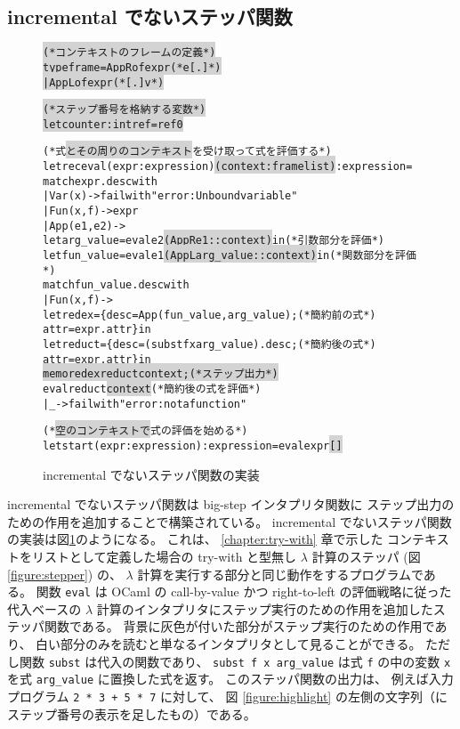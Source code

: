 \subsection{incremental でないステッパ関数}

\begin{figure}[t]
\begin{spacing}{0.8}
  \begin{alltt}
\colorbox{lightgray}{(* コンテキストのフレームの定義 *)}
\colorbox{lightgray}{type frame = AppR of expr  (* e [.] *)}
\colorbox{lightgray}{           | AppL of expr  (* [.] v *)}

\colorbox{lightgray}{(* ステップ番号を格納する変数 *)}
\colorbox{lightgray}{let counter : int ref = ref 0}

(* 式\colorbox{lightgray}{とその周りのコンテキスト}を受け取って式を評価する *)
let rec eval (expr : expression) \colorbox{lightgray}{(context : frame list)} : expression =
  match expr.desc with
    | Var (x) -> failwith "error: Unbound variable"
    | Fun (x, f) -> expr
    | App (e1, e2) ->
      let arg_value = eval e2 \colorbox{lightgray}{(AppR e1 :: context)} in      (* 引数部分を評価 *)
      let fun_value = eval e1 \colorbox{lightgray}{(AppL arg_value :: context)} in(*関数部分を評価 *)
      match fun_value.desc with
        | Fun (x, f) ->
          let redex = \{desc = App (fun_value, arg_value);       (* 簡約前の式 *)
                      attr = expr.attr\} in
          let reduct = \{desc = (subst f x arg_value).desc ;     (* 簡約後の式 *)
                        attr = expr.attr\} in
          \colorbox{lightgray}{memo redex reduct context;                          (* ステップ出力 *)}
          eval reduct \colorbox{lightgray}{context}                             (* 簡約後の式を評価 *)
        | _ -> failwith "error: not a function"

(* \colorbox{lightgray}{空のコンテキストで}式の評価を始める *)
let start (expr : expression) : expression = eval expr \colorbox{lightgray}{[]}
\end{alltt}
\end{spacing}
\caption{incremental でないステッパ関数の実装}
\label{figure:old-stepper}
\end{figure}

incremental でないステッパ関数は big-step インタプリタ関数に
ステップ出力のための作用を追加することで構築されている。
incremental でないステッパ関数の実装は図\ref{figure:old-stepper}のようになる。
これは、 \ref{chapter:try-with} 章で示した
コンテキストをリストとして定義した場合の
try-with と型無し $\lambda$ 計算のステッパ (図 \ref{figure:stepper}) の、
$\lambda$ 計算を実行する部分と同じ動作をするプログラムである。
関数 \texttt{eval} は OCaml の call-by-value かつ right-to-left
の評価戦略に従った代入ベースの $\lambda$
計算のインタプリタにステップ実行のための作用を追加したステッパ関数である。
背景に灰色が付いた部分がステップ実行のための作用であり、
白い部分のみを読むと単なるインタプリタとして見ることができる。
ただし関数 \texttt{subst} は代入の関数であり、
\texttt{subst f x arg\_value} は式 \texttt{f} の中の変数
\texttt{x} を式 \texttt{arg\_value} に置換した式を返す。
このステッパ関数の出力は、
例えば入力プログラム \texttt{2 * 3 + 5 * 7} に対して、
図 \ref{figure:highlight} の左側の文字列（にステップ番号の表示を足したもの）である。

